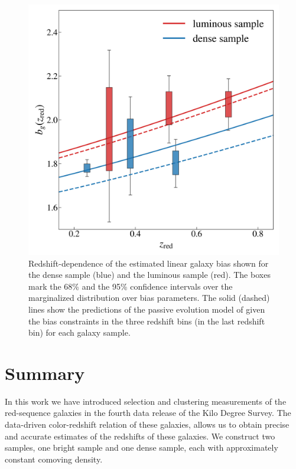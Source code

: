 \documentclass{aa}
\numberwithin{equation}{section}
\begin{document}
{\begin{figure}
\includegraphics[width=\columnwidth]{figures_tmp/b_estimate_boxed.png}
\caption{ Redshift-dependence of the estimated linear galaxy bias shown for the dense sample (blue) and the luminous sample (red). The boxes mark the 68\% and the 95\% confidence intervals over the marginalized distribution over bias parameters. The solid (dashed) lines show the predictions of the passive evolution model of \citet{Fry1996} given the bias constraints in the three redshift bins (in the last redshift bin) for each galaxy sample.} 
\label{fig:b_estimate}
\end{figure}


\section{Summary}\label{sec:summary} 

In this work we have introduced selection and clustering measurements of the red-sequence galaxies in the fourth data release of the Kilo Degree Survey. The data-driven color-redshift relation of these galaxies, allows us to obtain precise and accurate estimates of the redshifts of these galaxies. We construct two samples, one bright sample and one dense sample, each with approximately constant comoving density.

}
\end{document}
